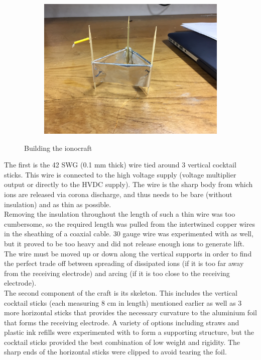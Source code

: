 \documentclass[11pt]{article}
\begin{document}
\begin{figure}[h!]
\begin{subfigure}{0.32\textwidth}
\caption{}
\label{fig:craft_2}
\end{subfigure}
\begin{subfigure}{0.32\textwidth}
\centering
\includegraphics[width = \textwidth]{craft_3}
\caption{}
\label{fig:craft_3}
\end{subfigure}
\caption{\label{fig:craft_construct} Building the ionocraft}
\end{figure}

The first is the 42 SWG (0.1 mm thick) wire tied around 3 vertical cocktail sticks. This wire is connected to the high voltage supply (voltage multiplier output or directly to the HVDC supply). The wire is the sharp body from which ions are released via corona discharge, and thus needs to be bare (without insulation) and as thin as possible.\\

Removing the insulation throughout the length of such a thin wire was too cumbersome, so the required length was pulled from the intertwined copper wires in the sheathing of a coaxial cable. 30 gauge wire was experimented with as well, but it proved to be too heavy and did not release enough ions to generate lift. The wire must be moved up or down along the vertical supports in order to find the perfect trade off between spreading of dissipated ions (if it is too far away from the receiving electrode) and arcing (if it is too close to the receiving electrode).\\

The second component of the craft is its skeleton. This includes the vertical cocktail sticks (each measuring 8 cm in length) mentioned earlier as well as 3 more horizontal sticks that provides the necessary curvature to the aluminium foil that forms the receiving electrode. A variety of options including straws and plastic ink refills were experimented with to form a supporting structure, but the cocktail sticks provided the best combination of low weight and rigidity. The sharp ends of the horizontal sticks were clipped to avoid tearing the foil.\\
\end{document}
